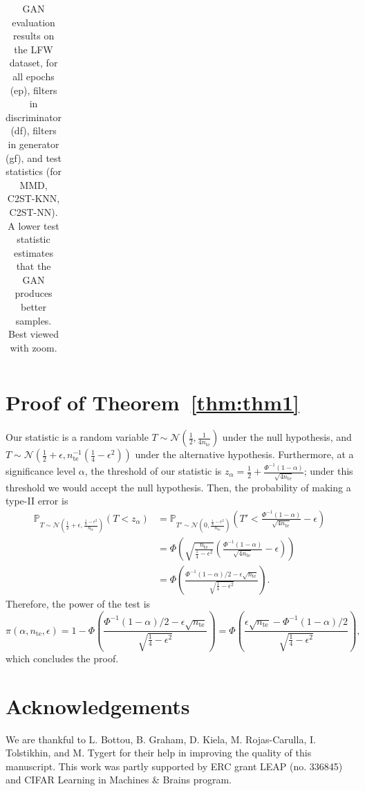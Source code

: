 \documentclass[a4paper]{article}
\begin{document}
\begin{table}[h!]
\begin{center}
{\begin{tabular}{lllcccc}
      \hline
    \end{tabular}
    }
    \end{center}
    \vspace{-0.2cm}
    \caption{GAN evaluation results on the LFW dataset, for all epochs (ep),
    filters in discriminator (df), filters in generator (gf), and test
    statistics (for MMD, C2ST-KNN, C2ST-NN). A lower test statistic estimates
    that the GAN produces better samples. Best viewed with zoom.}
    \vspace{-0.2cm}
    \label{table:faces}
  \end{table}
  \clearpage
  \newpage
 
  \section{Proof of Theorem~\ref{thm:thm1}}\label{app:proof}
  Our statistic is a random variable $T \sim
  \mathcal{N}\left(\frac{1}{2}, \frac{1}{4 n_\text{te}}\right)$ under the null
  hypothesis, and $T \sim \mathcal{N}\left(\frac{1}{2} + \epsilon,
  n_\text{te}^{-1}\left(\frac{1}{4}-\epsilon^2\right)\right)$ under the
  alternative hypothesis.  Furthermore, at a significance level $\alpha$, the
  threshold of our statistic is $z_\alpha = \frac{1}{2} +
  \frac{\Phi^{-1}(1-\alpha)}{\sqrt{4n_\text{te}}}$; under this threshold we
  would accept the null hypothesis. Then, the probability of making a type-II error is 
  \begin{align*}
    \mathbb{P}_{T\sim \mathcal{N}\left(\frac{1}{2}+\epsilon,
    \frac{\frac{1}{4}-\epsilon^2}{n_\text{te}}\right)}\left(T < z_\alpha \right) &=
    \mathbb{P}_{T'\sim \mathcal{N}\left(0,
    \frac{\frac{1}{4}-\epsilon^2}{n_\text{te}}\right)}\left(T' <
    \frac{\Phi^{-1}(1-\alpha)}{\sqrt{4n_\text{te}}}-\epsilon\right)\\
    &=\Phi\left(\sqrt{\frac{n_\text{te}}{\frac{1}{4}-\epsilon^2}}
    \left(
    \frac{\Phi^{-1}(1-\alpha)}{\sqrt{4n_\text{te}}}-\epsilon\right)\right)\\
    &=\Phi
    \left(
    \frac{\Phi^{-1}(1-\alpha)/2 - \epsilon\sqrt{n_\text{te}}}{\sqrt{\frac{1}{4}-\epsilon^2}}
    \right).
  \end{align*}
  Therefore, the power of the test is
  \begin{equation*}
    \pi(\alpha, n_\text{te}, \epsilon) = 1-\Phi
    \left(
    \frac{\Phi^{-1}(1-\alpha)/2 - \epsilon\sqrt{n_\text{te}}}{\sqrt{\frac{1}{4}-\epsilon^2}}
    \right) =
    \Phi
    \left(
    \frac{\epsilon\sqrt{n_\text{te}}-\Phi^{-1}(1-\alpha)/2}{\sqrt{\frac{1}{4}-\epsilon^2}}
    \right),
  \end{equation*}
  which concludes the proof.
  
  \section{Acknowledgements}
 
   We are thankful to L. Bottou, B. Graham, D. Kiela, M.  Rojas-Carulla, I.
   Tolstikhin, and M. Tygert for their help in improving the quality of this
   manuscript.  This work was partly supported by ERC grant LEAP (no. 336845)
   and CIFAR Learning in Machines \& Brains program.
\end{document}
